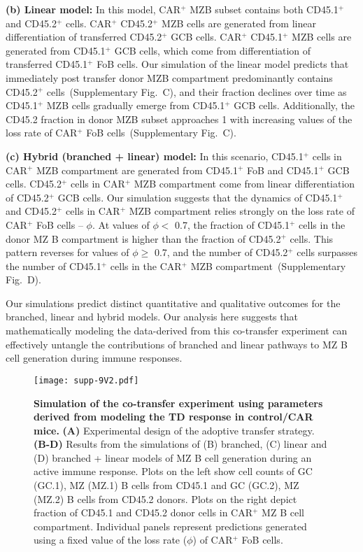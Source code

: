 \documentclass[11pt]{article}
\newcommand{\red}[1]{{\color{red}{#1}}}
\begin{document}
\textbf{(b) Linear model:}
In this model, CAR$^{+}$ MZB subset contains both CD45.1$^{+}$ and CD45.2$^{+}$ cells.
CAR$^{+}$ CD45.2$^{+}$ MZB cells are generated from linear differentiation of transferred CD45.2$^{+}$ GCB cells.
CAR$^{+}$ CD45.1$^{+}$ MZB cells are generated from CD45.1$^{+}$ GCB cells, which come from differentiation of transferred CD45.1$^{+}$ FoB cells.
Our simulation of the linear model predicts that immediately post transfer donor MZB compartment predominantly contains CD45.2$^{+}$ cells~(Supplementary Fig.~\red{XX}C), and their fraction declines over time as CD45.1$^{+}$ MZB cells gradually emerge from CD45.1$^{+}$ GCB cells. 
Additionally, the CD45.2 fraction in donor MZB subset approaches 1 with increasing values of the loss rate of CAR$^{+}$ FoB cells~(Supplementary Fig.~\red{XX}C). 


\textbf{(c) Hybrid (branched + linear) model:}
In this scenario, CD45.1$^{+}$ cells in CAR$^{+}$ MZB compartment are generated from CD45.1$^{+}$ FoB and CD45.1$^{+}$ GCB cells.  %
CD45.2$^{+}$ cells in CAR$^{+}$  MZB compartment come from linear differentiation of CD45.2$^{+}$ GCB cells.
Our simulation suggests that the dynamics of CD45.1$^{+}$ and CD45.2$^{+}$ cells in CAR$^{+}$ MZB compartment relies strongly on the loss rate of CAR$^{+}$ FoB cells --  $\phi$.
At values of $\phi <$ 0.7, the fraction of CD45.1$^{+}$ cells in the donor MZ B compartment is higher than the fraction of CD45.2$^{+}$ cells.
This pattern reverses for values of $\phi \ge$ 0.7, and the number of CD45.2$^{+}$ cells surpasses the number of  CD45.1$^{+}$ cells in the CAR$^{+}$  MZB compartment~(Supplementary Fig.~\red{XX}D).

Our simulations predict distinct quantitative and qualitative outcomes for the branched, linear and hybrid models.
Our analysis here suggests that mathematically modeling the data-derived from this co-transfer experiment can effectively untangle the contributions of branched and linear pathways to MZ B cell generation during immune responses.


\begin{figure}[h!]
\center
\texttt{[image: supp-9V2.pdf]}
\caption{
    \textbf{Simulation of the co-transfer experiment using parameters derived from modeling the TD response in control/CAR mice.}
    \textbf{(A)} Experimental design of the adoptive transfer strategy.
    \textbf{(B-D)} Results from the simulations of (B) branched, (C) linear and (D) branched + linear models of MZ B cell generation during an active immune response.
    Plots on the left  show cell counts of GC (GC.1), MZ (MZ.1) B cells from CD45.1 and GC (GC.2), MZ (MZ.2) B cells from CD45.2 donors.
    Plots on the right depict fraction of CD45.1 and CD45.2 donor cells in CAR$^+$ MZ B cell compartment.
    Individual panels represent predictions generated using a fixed value of the loss rate ($\phi$) of CAR$^{+}$ FoB cells.
    }
    \label{fig:co-transf}
 \end{figure}
 
\end{document}
